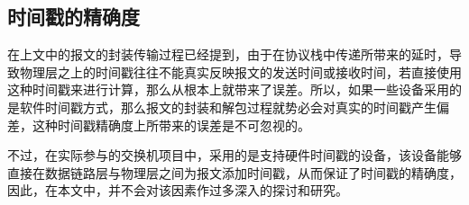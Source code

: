 \subsection{时间戳的精确度}
\label{sec:1588_problem_2}
在上文中的报文的封装传输过程已经提到，由于在协议栈中传递所带来的延时，导致物理层之上的时间戳往往不能真实反映报文的发送时间或接收时间，若直接使用这种时间戳来进行计算，那么从根本上就带来了误差\supercite{53}。所以，如果一些设备采用的是软件时间戳方式，那么报文的封装和解包过程就势必会对真实的时间戳产生偏差，这种时间戳精确度上所带来的误差是不可忽视的。

不过，在实际参与的交换机项目中，采用的是支持硬件时间戳的设备，该设备能够直接在数据链路层与物理层之间为报文添加时间戳，从而保证了时间戳的精确度，因此，在本文中，并不会对该因素作过多深入的探讨和研究。


